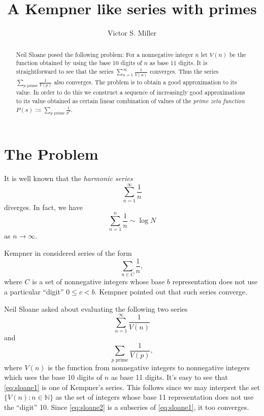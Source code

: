 \documentclass{article}
\title{A Kempner like series with primes}
\author{Victor S. Miller}
\newcommand{\NN}{\mathbb{N}}
\begin{document}
\maketitle
\begin{abstract}
  Neil Sloane posed the following problem: For a nonnegative integer
  $n$ let $V(n)$ be the function obtained by using the base 10 digits
  of $n$ as base 11 digits. It is straightforward to see that the
  series $\sum_{n=1}^\infty \frac{1}{V(n)}$ converges. Thus the series
  $\sum_{p \text{ prime}} \frac{1}{V(p)}$ also converges. The problem
  is to obtain a good approximation to its value. In order to do this
  we construct a sequence of increasingly good approximations to its
  value obtained as certain linear combination of values of the
  \emph{prime zeta function}
  $P(s) := \sum_{p \text{ prime}} \frac{1}{p^s}$.
\end{abstract}

\section{The Problem}
\label{sec:problem}

It is well known that the \emph{harmonic series}
\begin{displaymath}
  \sum_{n=1}^\infty \frac{1}{n}
\end{displaymath}
diverges. In fact, we have
\begin{displaymath}
  \sum_{n=1}^n \frac{1}{n} \sim \log N
\end{displaymath}
as $n \rightarrow \infty$.

Kempner in \cite{kempner1914curious}
considered series of the form
\begin{displaymath}
  \sum_{n \in C} \frac{1}{n},
\end{displaymath}
where $C$ is a set of nonnegative integers whose base $b$
representation does not use a particular ``digit'' $0 \le c <
b$. Kempner pointed out that such series converge.

Neil Sloane asked about evaluating the following two series
\begin{equation}
  \label{eq:sloane1}
  \sum_{n=1}^\infty \frac{1}{V(n)}
\end{equation}
and
\begin{equation}
  \label{eq:sloane2}
  \sum_{p \text{ prime}} \frac{1}{V(p)},
\end{equation}
where $V(n)$ is the function from nonnegative integers to
nonnegative integers which uses the base 10 digits of $n$ as base 11
digits. It's easy to see that \eqref{eq:sloane1} is one of Kempner's
series.  This follows since we may interpret the set
$\{V(n) : n \in \NN\}$ as the set of integers whose base 11
representation does not use the ``digit'' 10.  Since
\eqref{eq:sloane2} is a subseries of \eqref{eq:sloane1}, it too
converges.
\end{document}
